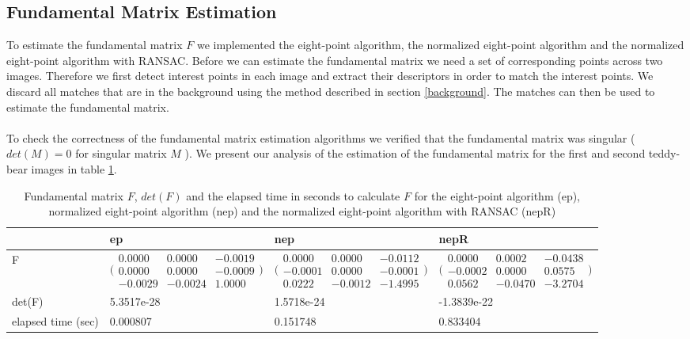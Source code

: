 \documentclass[12pt]{amsart}
\begin{document}
\subsection{Fundamental Matrix Estimation}
To estimate the fundamental matrix $F$ we implemented the eight-point algorithm, the normalized eight-point algorithm and the normalized eight-point algorithm with RANSAC. Before we can estimate the fundamental matrix we need a set of corresponding points across two images. Therefore we first detect interest points in each image and extract their descriptors in order to match the interest points. We discard all matches that are in the background using the method described in section \ref{background}. The matches can then be used to estimate the fundamental matrix. \\\\
To check the correctness of the fundamental matrix estimation algorithms we verified that the fundamental matrix was singular ($\textit{det}(M) = 0$ for singular matrix $M$ ). We present our analysis of the estimation of the fundamental matrix for the first and second teddy-bear images in table \ref{fund}.
\begin{table}
\center
    \begin{tabular}{l|l|l|l}
    ~                  & ep & nep & nepR \\ \hline
    F                  
    & $\bigl(\begin{smallmatrix}0.0000&0.0000&-0.0019\\ 0.0000&0.0000&-0.0009\\-0.0029&-0.0024&1.0000\end{smallmatrix} \bigr)$ 
    & $\bigl(\begin{smallmatrix}0.0000&0.0000&-0.0112\\ -0.0001&0.0000&-0.0001\\0.0222&-0.0012&-1.4995\end{smallmatrix} \bigr)$                      
    & $\bigl(\begin{smallmatrix}0.0000&0.0002&-0.0438\\ -0.0002&0.0000&0.0575\\0.0562&-0.0470&-3.2704\end{smallmatrix} \bigr)$                                  \\ \hline
    det(F)             & 5.3517e-28  & 1.5718e-24             & -1.3839e-22                        \\ \hline
    elapsed time (sec) & 0.000807    & 0.151748               & 0.833404                           \\
    \end{tabular}
    \caption{Fundamental matrix $F$, $\textit{det}(F)$ and the elapsed time in seconds to calculate $F$ for the eight-point algorithm (ep), normalized eight-point algorithm (nep) and the normalized eight-point algorithm with RANSAC (nepR)}
        \label{fund}

\end{table}
\end{document}

